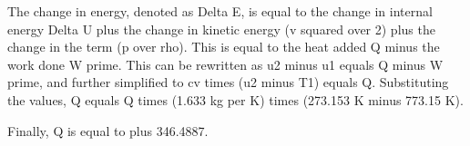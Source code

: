 The change in energy, denoted as Delta E, is equal to the change in internal energy Delta U plus the change in kinetic energy (v squared over 2) plus the change in the term (p over rho). This is equal to the heat added Q minus the work done W prime. This can be rewritten as u2 minus u1 equals Q minus W prime, and further simplified to cv times (u2 minus T1) equals Q. Substituting the values, Q equals Q times (1.633 kg per K) times (273.153 K minus 773.15 K).

Finally, Q is equal to plus 346.4887.